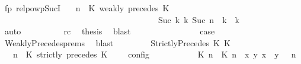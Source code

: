 \begin{isabellebody}
\ fp\ relpowp{\isacharunderscore}Suc{\isacharunderscore}I{}\ \isamarkupfalse%
\ {\isacartoucheopen}{\isacharparenleft}{\isasymGamma}{\isacharcomma}\ n\ {\isasymturnstile}\ {\isacharparenleft}{\isacharparenleft}K\ weakly\ precedes\ K\ {\isacharhash}\ {\isasymPsi}{\isacharparenright}\ {\isasymtriangleright}\ {\isasymPhi}{\isacharparenright}\isanewline
\ \ \ \ \ \ \ \ \ \ \ \ \ \ \ \ \ \ \ \ \ \ \ \ \ \ \ \ \ \ \ \ \ \ \ \ \ \ {\isasymhookrightarrow}\isactrlbsup Suc\ k\isactrlesup \ {\isacharparenleft}{\isasymGamma}\isactrlsub k{\isacharcomma}\ Suc\ n\ {\isasymturnstile}\ {\isasymPsi}\isactrlsub k\ {\isasymtriangleright}\ {\isasymPhi}\isactrlsub k{\isacharparenright}{\isacartoucheclose}\isanewline
\ \ \ \ \ \ \ \ \ \ \isamarkupfalse%
\ auto\isanewline
\ \ \ \ \ \ \ \ \isamarkupfalse%
\ rc\ \isamarkupfalse%
\ {\isacharquery}thesis\ \isamarkupfalse%
\ blast\isanewline
\ \ \ \ \ \ \isamarkupfalse%
\isanewline
\ \ \ \ \ \ \isamarkupfalse%
\ \isamarkupfalse%
\ {\isacharquery}case\ \isamarkupfalse%
\ WeaklyPrecedes{\isachardot}prems{\isacharparenleft}{}{\isacharparenright}\ \isamarkupfalse%
\ blast\isanewline
\ \ \isamarkupfalse%
\isanewline
\ \ \ \ \isamarkupfalse%
\ {\isacharparenleft}StrictlyPrecedes\ K\ K\isanewline
\ \ \ \ \ \ \isamarkupfalse%
\ {\isacartoucheopen}{\isasymlbrakk}\ {\isasymGamma}{\isacharcomma}\ n\ {\isasymturnstile}\ {\isacharparenleft}{\isacharparenleft}K\ strictly\ precedes\ K\ {\isacharhash}\ {\isasymPsi}{\isacharparenright}\ {\isasymtriangleright}\ {\isasymPhi}\ {\isasymrbrakk}\isactrlsub c\isactrlsub o\isactrlsub n\isactrlsub f\isactrlsub i\isactrlsub g\ {\isacharequal}\isanewline
\ \ \ \ \ \ \ \ {\isasymlbrakk}\ {\isacharparenleft}{\isacharparenleft}{\isasymlceil}{\isacharhash}\isactrlsup {\isasymle}\ K\ n{\isacharcomma}\ {\isacharhash}\isactrlsup {\isacharless}\ K\ n{\isasymrceil}\ {\isasymin}\ {\isacharparenleft}{\isasymlambda}{\isacharparenleft}x{\isacharcomma}\ y{\isacharparenright}{\isachardot}\ x\ {\isasymle}\ y{\isacharparenright}{\isacharparenright}\ {\isacharhash}\ {\isasymGamma}{\isacharparenright}{\isacharcomma}\ n\isanewline

\end{isabellebody}
